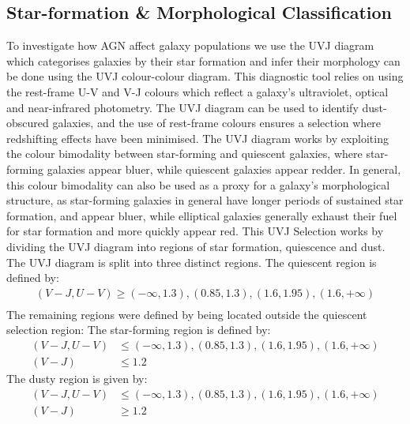\documentclass[
  journal=pasa,
  manuscript=research-paper,
  year=202X,
  volume=YY,
]{cup-journal}
\begin{document}
\subsection{Star-formation \& Morphological Classification} %
To investigate how AGN affect galaxy populations we use the UVJ diagram which categorises galaxies by their star formation and infer their morphology can be done using the UVJ colour-colour diagram. This diagnostic tool relies on using the rest-frame U-V and V-J colours which reflect a galaxy's ultraviolet, optical and near-infrared photometry. The UVJ diagram can be used to identify dust-obscured galaxies, and the use of rest-frame colours ensures a selection where redshifting effects have been minimised. The UVJ diagram works by exploiting the colour bimodality between star-forming and quiescent galaxies, where star-forming galaxies appear bluer, while quiescent galaxies appear redder. In general, this colour bimodality can also be used as a proxy for a galaxy's morphological structure, as star-forming galaxies in general have longer periods of sustained star formation, and appear bluer, while elliptical galaxies generally exhaust their fuel for star formation and more quickly appear red. This UVJ Selection works by dividing the UVJ diagram into regions of star formation, quiescence and dust. The UVJ diagram is split into three distinct regions.
The quiescent region is defined by:
\begin{align*}
    (V - J, U - V) \geq (-\infty, 1.3), (0.85, 1.3), (1.6, 1.95), (1.6, +\infty)\\
\end{align*}
The remaining regions were defined by being located outside the quiescent selection region:
The star-forming region is defined by:
\begin{align*}
    (V - J, U - V) &\leq (-\infty, 1.3), (0.85, 1.3), (1.6, 1.95), (1.6, +\infty)\\
    (V - J) &\leq 1.2
\end{align*}
The dusty region is given by:
\begin{align*}
 (V - J, U - V) &\leq (-\infty, 1.3), (0.85, 1.3), (1.6, 1.95), (1.6, +\infty)\\
    (V - J) &\geq 1.2   
\end{align*}
\end{document}
